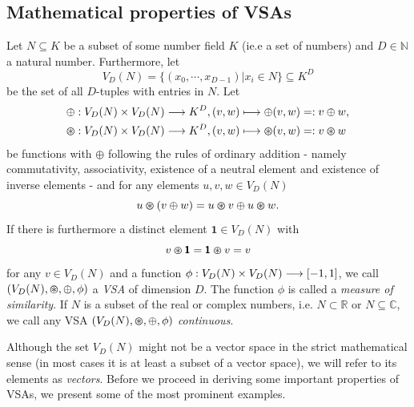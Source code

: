 \subsection{Mathematical properties of \aclp{VSA}}


\begin{defn}
	\label{def:VSA}
	Let $N \subseteq K$ be a subset of some number field $K$ (ie.e a set of numbers) and $D \in \mathbb{N}$ a natural number. 
	Furthermore, let 
	\[V_{D}(N)=\{\left(x_{0}, \cdots, x_{D-1}\right)  | x_{i} \in N\} \subseteq K^{D}\] 
	be the set of all $D$-tuples with entries in $N$. 
	Let
	\begin{align*}
	&\oplus: V_{D}(N) \times V_{D}(N) \longrightarrow K^{D}, (v,w) \longmapsto \oplus(v,w) =: v\oplus w, \\
	&\varoast: V_{D}(N) \times V_{D}(N) \longrightarrow K^{D}, (v,w) \longmapsto \varoast(v,w) =: v\varoast w
	\end{align*}
	be functions with $\oplus$ following the rules of ordinary addition - namely commutativity, associativity, existence of a neutral element and existence of inverse elements - and for any elements $u,v,w \in V_{D}(N)$
	\[u \varoast (v \oplus w) = u \varoast v \oplus u \varoast w.\]
	If there is furthermore a distinct element $\pmb{1} \in V_{D}(N)$ with 
	\[v \varoast \pmb{1} = \pmb{1} \varoast v = v\]
	for any $v \in V_{D}(N)$ and a function $\phi: V_{D}(N) \times V_{D}(N) \longrightarrow \left[-1,1\right]$, we call $(V_{D}(N), \varoast, \oplus, \phi)$ a \emph{\acrfull{VSA}} of dimension $D$.
	The function $\phi$ is called a \emph{measure of similarity}.
	If $N$ is a subset of the real or complex numbers, i.e. $N \subset \mathbb{R}$ or $N \subseteq \mathbb{C}$, we call any \ac{VSA} $\left(V_{D}(N), \varoast, \oplus, \phi\right)$ \emph{continuous}.
\end{defn}
Although the set $V_{D}(N)$ might not be a vector space in the strict mathematical sense (in most cases it is at least a subset of a vector space), we will refer to its elements as \emph{vectors}.
Before we proceed in deriving some important properties of \acp{VSA}, we present some of the most prominent examples.

